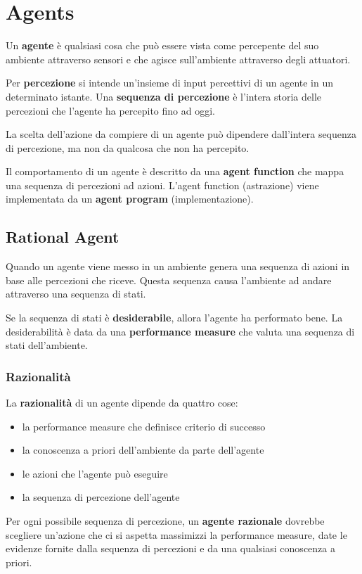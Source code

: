 \chapter{Agents}

Un \textbf{agente} è qualsiasi cosa che può essere vista come percepente del suo ambiente attraverso sensori e che agisce sull'ambiente attraverso degli attuatori.

Per \textbf{percezione} si intende un'insieme di input percettivi di un agente in un determinato istante.
Una \textbf{sequenza di percezione} è l'intera storia delle percezioni che l'agente ha percepito fino ad oggi.

La scelta dell'azione da compiere di un agente può dipendere dall'intera sequenza di percezione, ma non da qualcosa che non ha percepito.

Il comportamento di un agente è descritto da una \textbf{agent function} che mappa una sequenza di percezioni ad azioni.
L'agent function (astrazione) viene implementata da un \textbf{agent program} (implementazione).

\section{Rational Agent}
Quando un agente viene messo in un ambiente genera una sequenza di azioni in base alle percezioni che riceve.
Questa sequenza causa l'ambiente ad andare attraverso una sequenza di stati.

Se la sequenza di stati è \textbf{desiderabile}, allora l'agente ha performato bene. 
La desiderabilità è data da una \textbf{performance measure} che valuta una sequenza di stati dell'ambiente.

\subsection{Razionalità}
La \textbf{razionalità} di un agente dipende da quattro cose:
\begin{itemize}
  \item la performance measure che definisce criterio di successo
  \item la conoscenza a priori dell'ambiente da parte dell'agente
  \item le azioni che l'agente può eseguire
  \item la sequenza di percezione dell'agente
\end{itemize}

Per ogni possibile sequenza di percezione, un \textbf{agente razionale} dovrebbe scegliere un'azione che ci si aspetta massimizzi la performance measure,
date le evidenze fornite dalla sequenza di percezioni e da una qualsiasi conoscenza a priori.

